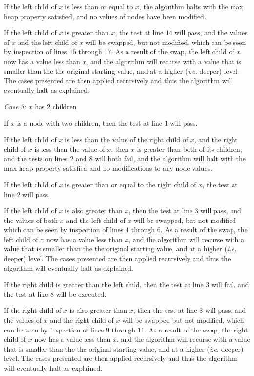 \documentclass[a4paper, 12pt, titlepage]{article}
\begin{document}
If the left child of $x$ is less than or equal to $x$,
the algorithm halts with the max heap property satisfied,
and no values of nodes have been modified.
    
If the left child of $x$ is greater than $x$,
the test at line $14$ will pass,
and the values of $x$ and the left child of $x$ will be swapped,
but not modified,
which can be seen by inspection of lines $15$ through $17$.
As a result of the swap,
the left child of $x$ now has a value less than $x$,
and the algorithm will recurse with a value that is smaller than the the original starting value,
and at a higher (\textit{i.e.} deeper) level.
The cases presented are then applied recursively and thus the algorithm will eventually halt as explained.


\noindent
\underline{\textit{Case 3:} $x$ has $2$ children}

If $x$ is a node with two children,
then the test at line $1$ will pass.
    
If the left child of $x$ is less than the value of the right child of $x$,
and the right child of $x$ is less than the value of $x$,
then $x$ is greater than both of its children,
and the tests on lines $2$ and $8$ will both fail,
and the algorithm will halt with the max heap property satisfied and no modifications to any node values.
    
If the left child of $x$ is greater than or equal to the right child of $x$,
the test at line 2 will pass.

If the left child of $x$ is also greater than $x$,
then the test at line $3$ will pass,
and the values of both $x$ and the left child of $x$ will be swapped,
but not modified which can be seen by inspection of lines $4$ through $6$.
As a result of the swap,
the left child of $x$ now has a value less than $x$,
and the algorithm will recurse with a value that is smaller than the the original starting value,
and at a higher (\textit{i.e.} deeper) level.
The cases presented are then applied recursively and thus the algorithm will eventually halt as explained.

If the right child is greater than the left child,
then the test at line $3$ will fail,
and the test at line $8$ will be executed.

If the right child of $x$ is also greater than $x$,
then the test at line $8$ will pass,
and the values of $x$ and the right child of $x$ will be swapped but not modified,
which can be seen by inspection of lines $9$ through $11$.
As a result of the swap,
the right child of $x$ now has a value less than $x$,
and the algorithm will recurse with a value that is smaller than the the original starting value,
and at a higher (\textit{i.e.} deeper) level.
The cases presented are then applied recursively and thus the algorithm will eventually halt as explained.
\end{document}
